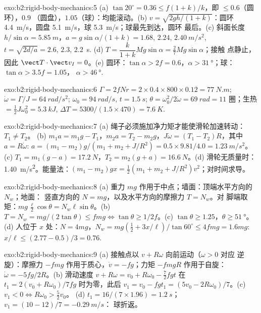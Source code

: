 \begin{solution}{exo:b2:rigid-body-mechanics:5}
(a) $\tan20^\circ = 0.36 \le f(1 + k)/k$，即 $\le 0.6$（圆环），$0.9$
（圆盘），$1.05$（球）：均能滚动。(b) $v = \sqrt{2gh/(1 + k)}$：圆环
\qty{4.4}{m/s}，圆盘 \qty{5.1}{m/s}，球 \qty{5.3}{m/s}；球最先到达，圆环
最后。(c) 斜面长度 $h/\sin\alpha = \qty{5.85}{m}$，$a = g\sin\alpha/(1 + k) =
1.68$, $2.24$, $\qty{2.40}{m/s^2}$, $t = \sqrt{2d/a} = 2.6$, $2.3$, \qty{2.2}{s}.
(d) $T = \dfrac{k}{1 + k}Mg\sin\alpha = \tfrac27Mg\sin\alpha$；接触
点静止，因此 $\vect T\cdot\vect v_I = 0$。(e) 圆环：$\tan\alpha >
2f = 0.6$，$\alpha > \qty{31}{\degree}$；球：$\tan\alpha > 3.5f = 1.05$，
$\alpha > \qty{46}{\degree}$.
\end{solution}

\begin{solution}{exo:b2:rigid-body-mechanics:6}
$\Gamma = 2fNr = 2 \times 0.4 \times 800 \times 0.12 = \qty{77}{N.m}$; $\dot\omega =
\Gamma/J = \qty{64}{rad/s^2}$; $\omega_0 = \qty{94}{rad/s}$, $t = \qty{1.5}{s}$;
$\theta = \omega_0^2/2\dot\omega = \qty{69}{rad} = 11$ 圈；生热 $= \tfrac12J
\omega_0^2 = \qty{5.3}{kJ}$, $\Delta T = 5300/(1.5 \times 470) = \qty{7.6}{K}$.
\end{solution}

\begin{solution}{exo:b2:rigid-body-mechanics:7}
(a) 绳子必须施加净力矩才能使滑轮加速转动：$T_1 \ne T_2$。
(b) $m_1a = m_1g - T_1$，$m_2a = T_2 - m_2g$，$J\dot\omega = (T_1 - T_2)R$，其中
$a = R\dot\omega$: $a = (m_1 - m_2)g/(m_1 + m_2 + J/R^2) = 0.5 \times 9.81/4.0 =
\qty{1.23}{m/s^2}$。(c) $T_1 = m_1(g - a) = \qty{17.2}{N}$，$T_2 = m_2(g + a) =
\qty{16.6}{N}$。(d) 滑轮无质量时：\qty{1.40}{m/s^2}。能量法：$(m_1 - m_2)gx =
\tfrac12(m_1 + m_2 + J/R^2)v^2$；对时间求导。
\end{solution}

\begin{solution}{exo:b2:rigid-body-mechanics:8}
(a) 重力 $mg$ 作用于中点；墙面：顶端水平方向的 $N_w$；地面：
竖直方向的 $N = mg$，以及水平方向的摩擦力 $T = N_w$。对
脚端取矩：$mg\,\tfrac{\ell}2\cos\theta = N_w\ell\sin\theta$。(b) $T = N_w =
mg/(2\tan\theta) \le fmg \iff \tan\theta \ge 1/2f$。(c) $\tan\theta \ge
1.25$，$\theta \ge \qty{51}{\degree}$。(d) 人位于 $x$ 处：$N = 4mg$，$N_w =
mg(\tfrac12 + 3x/\ell)/\tan60^\circ \le 4fmg = 1.6mg$: $x/\ell \le (2.77 -
0.5)/3 = 0.76$.
\end{solution}

\begin{solution}{exo:b2:rigid-body-mechanics:9}
(a) 接触点以 $v + R\omega$ 向前运动（$\omega > 0$ 对应
逆旋）：摩擦力 $-fmg$ 作用于质心，$\dot v = -fg$；力矩
$-fmgR$ 作用于自旋：$\dot\omega = -5fg/2R$。(b) 滑动速度 $v + R\omega = v_0 +
R\omega_0 - \tfrac72fgt$ 在 $t_1 = 2(v_0 + R\omega_0)/7fg$ 时为零，此后 $v_1
= v_0 - fgt_1 = (5v_0 - 2R\omega_0)/7$。(c) $v_1 < 0 \iff R\omega_0 > \tfrac52v_0$。
(d) $t_1 = 16/(7 \times 1.96) = \qty{1.2}{s}$；$v_1 = (10 - 12)/7 = \qty{-0.29}{m/s}$：
球折返。
\end{solution}

